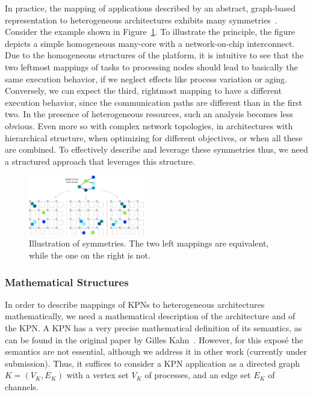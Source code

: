 \documentclass[sigplan,10pt]{acmart}
\begin{document}
In practice, the mapping of applications described by an abstract, graph-based representation to heterogeneous architectures exhibits many symmetries~\cite{goens_iess15,goens_taco17}.
Consider the example shown in Figure~\ref{fig:symmintro}. To illustrate the principle, the figure depicts a simple homogeneous many-core with a network-on-chip interconnect.
Due to the homogeneous structures of the platform, it is intuitive to see that the two leftmost mappings of tasks to processing nodes should lead to basically the same execution behavior, if we neglect effects like process variation or aging.
Conversely, we can expect the third, rightmost mapping to have a different execution behavior, since the communication paths are different than in the first two. 
In the presence of heterogeneous resources, such an analysis becomes less obvious.
Even more so with complex network topologies, in architectures with hierarchical structure, when optimizing for different objectives, or when all these are combined.
To effectively describe and leverage these symmetries thus, we need a structured approach that leverages this structure.

\begin{figure}[h]
	\centering
	\includegraphics[width=0.45\textwidth]{figures/SymmetriesIntro.pdf}
	\caption{Illustration of symmetries. The two left mappings are equivalent, while the one on the right is not.}
	\label{fig:symmintro}
\end{figure}


\subsubsection{Mathematical Structures}

In order to describe mappings of KPNs to heterogeneous architectures mathematically, we need a mathematical description of the architecture and of the KPN. 
A KPN has a very precise mathematical definition of its semantics, as can be found in the original paper by Gilles Kahn~\cite{kahn74}.
However, for this exposé the semantics are not essential, although we address it in other work (currently under submission).
Thus, it suffices to consider a KPN application as a directed graph $K = (V_K,E_K)$ with a vertex set $V_K$ of processes, and an edge set $E_K$ of channels.
\end{document}
